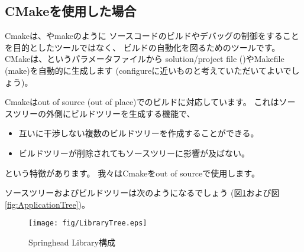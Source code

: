 \subsection{CMakeを使用した場合}
\label{subsec:WhenUsedCMake}

\noindent
Cmakeは、\VS やmakeのように
ソースコードのビルドやデバッグの制御をすることを目的としたツールではなく、
ビルドの自動化を図るためのツールです。
CMakeは、\CMakeLists{}というパラメータファイルから
solution/project file (\VS)やMakefile (make)を自動的に生成します
(configureに近いものと考えていただいてよいでしょう)。

\medskip
\noindent
Cmakeはout of source (out of place)でのビルドに対応しています。
これはソースツリーの外側にビルドツリーを生成する機能で、
\begin{itemize}
  \item	互いに干渉しない複数のビルドツリーを作成することができる。
  \item	ビルドツリーが削除されてもソースツリーに影響が及ばない。
\end{itemize}
という特徴があります。
我々はCmakeをout of sourceで使用します。

\medskip
\noindent
ソースツリーおよびビルドツリーは次のようになるでしょう
(図\ref{fig:SpringheadLibraryTree}および図\ref{fig:ApplicationTree})。

\ifLwarp
{}
\begin{narrow}
    \begin{figure}[h]
	\begin{center}
	\texttt{[image: fig/LibraryTree.eps]}
	\end{center}
	\caption{Springhead Library構成}
	\label{fig:SpringheadLibraryTree}
    \end{figure}
\end{narrow}
\else
\begin{narrow}\begin{figure}[h]
    \begin{narrow}[40pt]\begin{minipage}{\textwidth}
	{\footnotesize{}}
	\medskip
    \end{minipage}\end{narrow}
\end{figure}\end{narrow}
\fi

